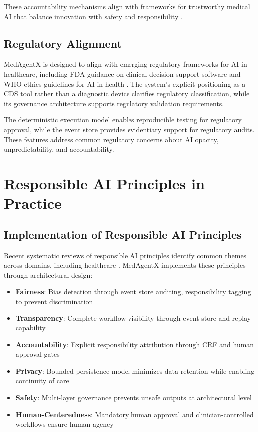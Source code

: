 \documentclass[journal]{IEEEtran}
\begin{document}
These accountability mechanisms align with frameworks for trustworthy medical AI that balance innovation with safety and responsibility \cite{ethics_governance_medical_ai_2023}.

\subsection{Regulatory Alignment}
MedAgentX is designed to align with emerging regulatory frameworks for AI in healthcare, including FDA guidance on clinical decision support software \cite{fda2021} and WHO ethics guidelines for AI in health \cite{who2021}. The system's explicit positioning as a CDS tool rather than a diagnostic device clarifies regulatory classification, while its governance architecture supports regulatory validation requirements.

The deterministic execution model enables reproducible testing for regulatory approval, while the event store provides evidentiary support for regulatory audits. These features address common regulatory concerns about AI opacity, unpredictability, and accountability.

\newpage
\section{Responsible AI Principles in Practice}

\subsection{Implementation of Responsible AI Principles}
Recent systematic reviews of responsible AI principles identify common themes across domains, including healthcare \cite{responsible_ai_principles_2024}. MedAgentX implements these principles through architectural design:

\begin{itemize}
    \item \textbf{Fairness}: Bias detection through event store auditing, responsibility tagging to prevent discrimination
    \item \textbf{Transparency}: Complete workflow visibility through event store and replay capability
    \item \textbf{Accountability}: Explicit responsibility attribution through CRF and human approval gates
    \item \textbf{Privacy}: Bounded persistence model minimizes data retention while enabling continuity of care
    \item \textbf{Safety}: Multi-layer governance prevents unsafe outputs at architectural level
    \item \textbf{Human-Centeredness}: Mandatory human approval and clinician-controlled workflows ensure human agency
\end{itemize}
\end{document}
